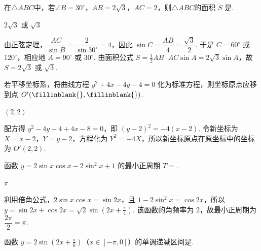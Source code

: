 \documentclass[UTF8,a4paper,oneside,11pt]{ctexbook}
\begin{document}
\begin{problem}
在\(\triangle ABC\)中，若\(\angle B=30^{\circ}\)，\(AB=2\sqrt{3}\)，\(AC=2\)，则\(\triangle ABC\)的面积 \(S\) 是\fillinblank{}.
\end{problem}

\begin{answer}
\(2\sqrt{3}\) 或 \(\sqrt{3}\)
\end{answer}

\begin{solution}
由正弦定理，\(\dfrac{AC}{\sin B}=\dfrac{2}{\sin30^{\circ}}=4\)，因此 \(\sin C=\dfrac{AB}{4}=\dfrac{\sqrt{3}}{2}\). 于是 \(C=60^{\circ}\) 或 \(120^{\circ}\)，相应地 \(A=90^{\circ}\) 或 \(30^{\circ}\). 由面积公式
\(S=\frac12 AB\cdot AC\sin A=2\sqrt{3}\sin A\)，故 \(S=2\sqrt{3}\) 或 \(\sqrt{3}\).
\end{solution}

\begin{problem}
若平移坐标系，将曲线方程 \(y^{2} + 4x - 4y - 4 = 0 \) 化为标准方程，则坐标原点应移到点 \(O'(\fillinblank{},\fillinblank{}) \).
\end{problem}

\begin{answer}
\((2,2)\)
\end{answer}

\begin{solution}
配方得 \(y^{2}-4y+4+4x-8=0\)，即 \((y-2)^{2}=-4(x-2)\). 令新坐标为 \(X=x-2\)，\(Y=y-2\)，方程化为 \(Y^{2}=-4X\)，所以新坐标原点在原坐标中的坐标为 \(O'(2,2)\).
\end{solution}

\begin{problem}
函数 \(y = 2\sin x \cos x - 2\sin^{2}x + 1 \) 的最小正周期 \(T=\)\fillinblank{}.
\end{problem}

\begin{answer}
\(\pi\)
\end{answer}

\begin{solution}
利用倍角公式，\(2\sin x\cos x=\sin2x\)，且 \(1-2\sin^{2}x=\cos2x\)，所以 \(y=\sin2x+\cos2x=\sqrt2\sin\left(2x+\frac{\pi}{4}\right)\). 该函数的角频率为 \(2\)，故最小正周期为 \(\dfrac{2\pi}{2}=\pi\).
\end{solution}

\begin{problem}
函数 \(y = 2\sin(2x + \frac{\pi}{6})\)（\(x \in [-\pi, 0]\)）的单调递减区间是\fillinblank{}.
\end{problem}
\end{document}

